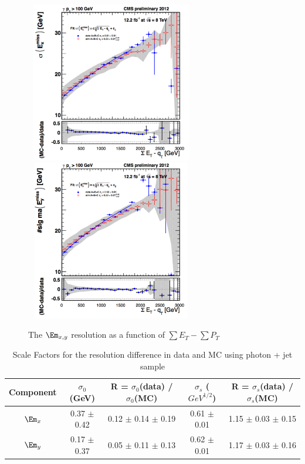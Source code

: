 \begin{figure}[!h]
 \centering
 {\label{fig:fit3a}\includegraphics[width=7.5cm,height=7cm]{analysis_figs/ex.pdf}}
 {\label{fig:fit3b}\includegraphics[width=7.5cm,height=7cm]{analysis_figs/ey.pdf}}
 \caption{The ${\Em}_{x,y}$ resolution as a function of $\sum{E_T} - \sum{P_T}$ }
 \label{fig:FIT3}
\end{figure}     

\begin{table}[!h]
\centering
 \caption{Scale Factors for the \met resolution difference in data and MC using photon + jet sample}
 \label{met_table}         
 \begin{tabular}{|c|c|c||c|c|}
 \hline
Component     &  $\sigma_{0}$ (GeV) & R = $\sigma_{0}$(data) / $\sigma_{0}$(MC) &  $\sigma_{s}$ ($GeV^{1/2}$) & R = $\sigma_{s}$(data) / $\sigma_{s}$(MC)   \\ 
 \hline
 \hline
   ${\Em_x}$    & 0.37 $\pm$ 0.42 & 0.12 $\pm$ 0.14 $\pm$ 0.19 & 0.61 $\pm$ 0.01 & 1.15 $\pm$ 0.03 $\pm$ 0.15 \\                    
   ${\Em_y}$    & 0.17 $\pm$ 0.37 & 0.05 $\pm$ 0.11 $\pm$ 0.13 & 0.62 $\pm$ 0.01 & 1.17 $\pm$ 0.03 $\pm$ 0.16 \\                    
\hline
 \end{tabular}
\end{table}

